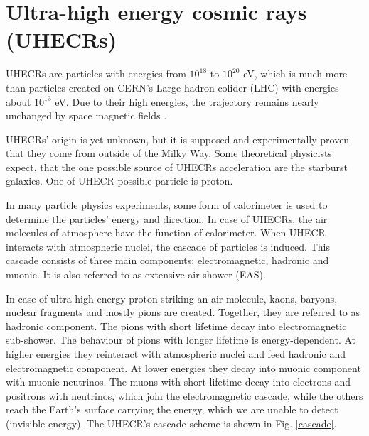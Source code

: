 \section{Ultra-high energy cosmic rays (UHECRs)}
UHECRs are particles with energies from $10^{18}$ to $10^{20}$ eV, which is much more than particles created on CERN's Large hadron colider (LHC) with energies about $10^{13}$ eV. Due to their high energies, the trajectory remains nearly unchanged by space magnetic fields \cite{Benjamin_Skuse}.
\par
UHECRs' origin is yet unknown, but it is supposed and experimentally proven that they come from outside of the Milky Way. Some theoretical physicists expect, that the one possible source of UHECRs acceleration are the starburst galaxies. One of UHECR possible particle is proton. 
\par
In many particle physics experiments, some form of calorimeter is used to determine the particles' energy and direction. In case of UHECRs, the air molecules of atmosphere have the function of calorimeter.
When UHECR interacts with atmospheric nuclei, the cascade of particles is induced. This cascade consists of three main components: electromagnetic, hadronic and muonic. It is also referred to as extensive air shower (EAS).
\par
In case of ultra-high energy proton striking an air molecule, kaons, baryons, nuclear fragments and mostly pions are created. Together, they are referred to as hadronic component. The pions with short lifetime decay into electromagnetic sub-shower. The behaviour of pions with longer lifetime is energy-dependent. At higher energies they reinteract with atmospheric nuclei and feed hadronic and electromagnetic component. At lower energies they decay into muonic component with muonic neutrinos. The muons with short lifetime decay into electrons and positrons with neutrinos, which join the electromagnetic cascade, while the others reach the Earth's surface carrying the energy, which we are unable to detect (invisible energy). The UHECR's cascade scheme is shown in Fig. \ref{cascade}. 
